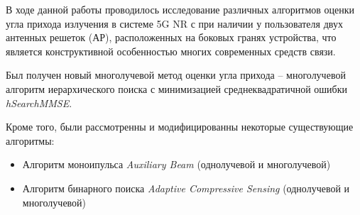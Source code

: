 \Conclusion
В ходе данной работы проводилось исследование различных алгоритмов оценки угла
прихода излучения в системе 5G NR с при наличии у пользователя двух антенных
решеток (АР), расположенных на боковых гранях устройства, что является
конструктивной особенностью многих современных средств связи. 

Был получен новый многолучевой метод оценки угла прихода -- многолучевой
алгоритм иерархического поиска с минимизацией среднеквадратичной ошибки
\textit{hSearchMMSE}.

Кроме того, были рассмотренны и модифицированны некоторые существующие алгоритмы:
\begin{itemize}
    \item Алгоритм моноипульса \textit{Auxiliary Beam} (однолучевой и многолучевой)
    \item Алгоритм бинарного поиска \textit{Adaptive Compressive Sensing} (однолучевой и многолучевой)
\end{itemize}


